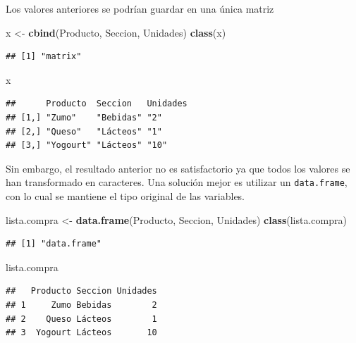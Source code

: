 \documentclass[]{book}
\newenvironment{Shaded}{\begin{snugshade}}{\end{snugshade}}
\newcommand{\KeywordTok}[1]{\textcolor[rgb]{0.13,0.29,0.53}{\textbf{#1}}}
\newcommand{\NormalTok}[1]{#1}
\newcommand{\StringTok}[1]{\textcolor[rgb]{0.31,0.60,0.02}{#1}}
\begin{document}
Los valores anteriores se podrían guardar en una única matriz

\begin{Shaded}
\begin{Highlighting}[]
\NormalTok{x <-}\StringTok{ }\KeywordTok{cbind}\NormalTok{(Producto, Seccion, Unidades)}
\KeywordTok{class}\NormalTok{(x)}
\end{Highlighting}
\end{Shaded}

\begin{verbatim}
## [1] "matrix"
\end{verbatim}

\begin{Shaded}
\begin{Highlighting}[]
\NormalTok{x}
\end{Highlighting}
\end{Shaded}

\begin{verbatim}
##      Producto  Seccion   Unidades
## [1,] "Zumo"    "Bebidas" "2"     
## [2,] "Queso"   "Lácteos" "1"     
## [3,] "Yogourt" "Lácteos" "10"
\end{verbatim}

Sin embargo, el resultado anterior no es satisfactorio ya que todos
los valores se han transformado en caracteres. Una solución mejor es
utilizar un \texttt{data.frame}, con lo cual se mantiene el tipo original de las variables.

\begin{Shaded}
\begin{Highlighting}[]
\NormalTok{lista.compra <-}\StringTok{ }\KeywordTok{data.frame}\NormalTok{(Producto, Seccion, Unidades)}
\KeywordTok{class}\NormalTok{(lista.compra)}
\end{Highlighting}
\end{Shaded}

\begin{verbatim}
## [1] "data.frame"
\end{verbatim}

\begin{Shaded}
\begin{Highlighting}[]
\NormalTok{lista.compra}
\end{Highlighting}
\end{Shaded}

\begin{verbatim}
##   Producto Seccion Unidades
## 1     Zumo Bebidas        2
## 2    Queso Lácteos        1
## 3  Yogourt Lácteos       10
\end{verbatim}
\end{document}
